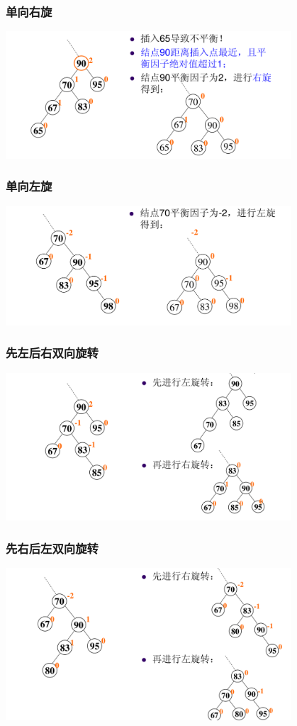 \begin{frame}[fragile]
  \frametitle{单向右旋}
  \includegraphics[width=0.8\textwidth]{figs/AVL-4.png}
\end{frame}


\begin{frame}[fragile]
  \frametitle{单向左旋}
  \includegraphics[width=0.8\textwidth]{figs/AVL-5.png}
\end{frame}


\begin{frame}[fragile]
  \frametitle{先左后右双向旋转}
  \includegraphics[width=0.8\textwidth]{figs/AVL-6.png}
\end{frame}


\begin{frame}[fragile]
  \frametitle{先右后左双向旋转}
  \includegraphics[width=0.8\textwidth]{figs/AVL-7.png}
\end{frame}


